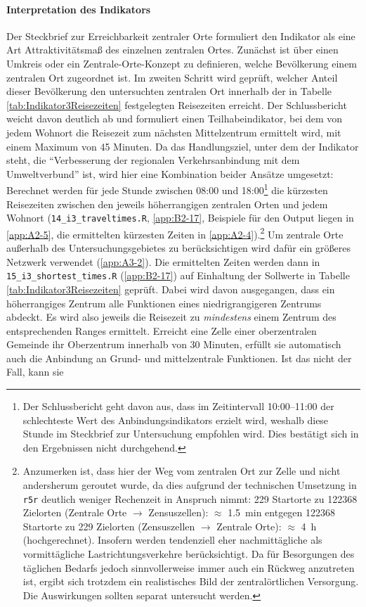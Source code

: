 \documentclass[11pt,pdftex,a4paper]{scrartcl}
\begin{document}
	\paragraph{Interpretation des Indikators}
	Der Steckbrief zur Erreichbarkeit zentraler Orte \parencite[28--30]{bmdvIndikatorenLeichtGemacht2025} formuliert den Indikator als eine Art Attraktivitätsmaß des einzelnen zentralen Ortes. Zunächst ist über einen Umkreis oder ein Zentrale-Orte-Konzept zu definieren, welche Bevölkerung einem zentralen Ort zugeordnet ist. Im zweiten Schritt wird geprüft, welcher Anteil dieser Bevölkerung den untersuchten zentralen Ort innerhalb der in Tabelle \ref{tab:Indikator3Reisezeiten} festgelegten Reisezeiten erreicht. Der Schlussbericht weicht davon deutlich ab und formuliert einen Teilhabeindikator, bei dem von jedem Wohnort die Reisezeit zum nächsten Mittelzentrum ermittelt wird, mit einem Maximum von 45 Minuten. Da das Handlungsziel, unter dem der Indikator steht, die \enquote{Verbesserung der regionalen Verkehrsanbindung mit dem Umweltverbund} \parencite[14]{bmdvIndikatorenLeichtGemacht2025} ist, wird hier eine Kombination beider Ansätze umgesetzt: Berechnet werden für jede Stunde zwischen 08:00 und 18:00\footnote{Der Schlussbericht geht davon aus, dass im Zeitintervall 10:00--11:00 der schlechteste Wert des Anbindungsindikators erzielt wird, weshalb diese Stunde im Steckbrief zur Untersuchung empfohlen wird. Dies bestätigt sich in den Ergebnissen nicht durchgehend.} die kürzesten Reisezeiten zwischen den jeweils höherrangigen zentralen Orten und jedem Wohnort (\texttt{14\_i3\_traveltimes.R}, \ref{app:B2-17}, Beispiele für den Output liegen in \ref{app:A2-5}, die ermittelten kürzesten Zeiten in \ref{app:A2-4}).\footnote{Anzumerken ist, dass hier der Weg vom zentralen Ort zur Zelle und nicht andersherum geroutet wurde, da dies aufgrund der technischen Umsetzung in \texttt{r5r} deutlich weniger Rechenzeit in Anspruch nimmt: \num{229} Startorte zu \num{122368} Zielorten (Zentrale Orte $\rightarrow$ Zensuszellen): $\approx$ \SI{1.5}{\minute} entgegen \num{122368} Startorte zu \num{229} Zielorten (Zensuszellen $\rightarrow$ Zentrale Orte): $\approx$ \SI{4}{\hour} (hochgerechnet). Insofern werden tendenziell eher nachmittägliche als vormittägliche Lastrichtungsverkehre berücksichtigt. Da für Besorgungen des täglichen Bedarfs jedoch sinnvollerweise immer auch ein Rückweg anzutreten ist, ergibt sich trotzdem ein realistisches Bild der zentralörtlichen Versorgung. Die Auswirkungen sollten separat untersucht werden.} Um zentrale Orte außerhalb des Untersuchungsgebietes zu berücksichtigen wird dafür ein größeres Netzwerk verwendet (\ref{app:A3-2}). Die ermittelten Zeiten werden dann in \texttt{15\_i3\_shortest\_times.R} (\ref{app:B2-17}) auf Einhaltung der Sollwerte in Tabelle \ref{tab:Indikator3Reisezeiten} geprüft. Dabei wird davon ausgegangen, dass ein höherrangiges Zentrum alle Funktionen eines niedrigrangigeren Zentrums abdeckt. Es wird also jeweils die Reisezeit zu \textit{mindestens} einem Zentrum des entsprechenden Ranges ermittelt. Erreicht eine Zelle einer oberzentralen Gemeinde ihr Oberzentrum innerhalb von 30 Minuten, erfüllt sie automatisch auch die Anbindung an Grund- und mittelzentrale Funktionen. Ist das nicht der Fall, kann sie 
\end{document}
